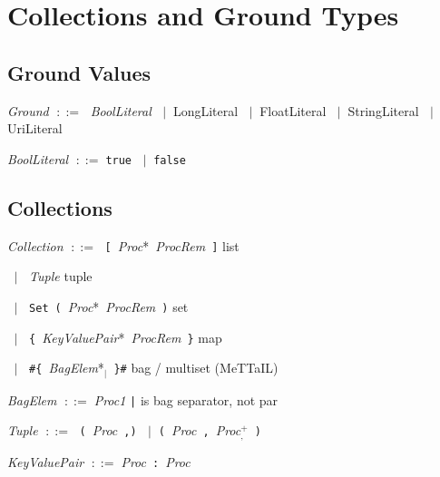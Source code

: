 \documentclass[11pt,a4paper]{article}
\newcommand{\kw}[1]{\texttt{\textcolor{kw}{#1}}}       %
\newcommand{\sym}[1]{\texttt{#1}}                       %
\newcommand{\nt}[1]{\textit{\textcolor{nt}{#1}}}        %
\newcommand{\tok}[1]{\textsf{#1}}                       %
\newcommand{\OR}{\ensuremath{\;\mid\;}}                  %
\newcommand{\bnfdef}{\ensuremath{\;::=\;}}               %
\newenvironment{grammar}{%
  \par\smallskip\begin{list}{}{%
    \setlength{\leftmargin}{1.5em}%
    \setlength{\itemsep}{2pt}%
    \setlength{\parsep}{0pt}}%
}{\end{list}\smallskip}
\begin{document}
\section{Collections and Ground Types}
\label{sec:collections}

\subsection{Ground Values}

\begin{grammar}
\item \nt{Ground} \bnfdef
    \nt{BoolLiteral}
    \OR \tok{LongLiteral}
    \OR \tok{FloatLiteral}
    \OR \tok{StringLiteral}
    \OR \tok{UriLiteral}
\item \nt{BoolLiteral} \bnfdef \kw{true} \OR \kw{false}
\end{grammar}

\subsection{Collections}

\begin{grammar}
\item \nt{Collection} \bnfdef
    \sym{[}~\nt{Proc}*~\nt{ProcRem}~\sym{]}
    \hfill\textcolor{cmt}{list}
\item \phantom{\nt{Collection}} \OR
    \nt{Tuple}
    \hfill\textcolor{cmt}{tuple}
\item \phantom{\nt{Collection}} \OR
    \kw{Set}~\sym{(}~\nt{Proc}*~\nt{ProcRem}~\sym{)}
    \hfill\textcolor{cmt}{set}
\item \phantom{\nt{Collection}} \OR
    \sym{\{}~\nt{KeyValuePair}*~\nt{ProcRem}~\sym{\}}
    \hfill\textcolor{cmt}{map}
\item \phantom{\nt{Collection}} \OR
    \sym{\#\{}~\nt{BagElem}*$_{\texttt{|}}$~\sym{\}\#}
    \hfill\textcolor{cmt}{bag / multiset (MeTTaIL)}
\item \nt{BagElem} \bnfdef \nt{Proc1}
    \hfill\textcolor{cmt}{\sym{|} is bag separator, not par}
\item \nt{Tuple} \bnfdef
    \sym{(}~\nt{Proc}~\sym{,)}
    \OR \sym{(}~\nt{Proc}~\sym{,}~\nt{Proc}$^+_{\texttt{,}}$~\sym{)}
\item \nt{KeyValuePair} \bnfdef \nt{Proc}~\sym{:}~\nt{Proc}
\end{grammar}
\end{document}
